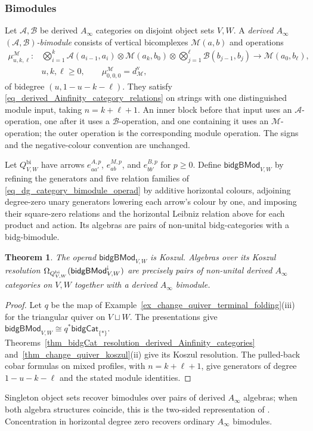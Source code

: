 \documentclass[11pt,letterpaper]{article}
\numberwithin{equation}{section}
\theoremstyle{plain}
\newtheorem{thm}{Theorem}[section]
\theoremstyle{definition}
\theoremstyle{remark}
\newcommand{\antishriek}{%
	\mathord{\mathchoice
		{\rotatebox[origin=c]{180}{$\displaystyle !$}}
		{\rotatebox[origin=c]{180}{$\textstyle !$}}
		{\rotatebox[origin=c]{180}{$\scriptstyle !$}}
		{\rotatebox[origin=c]{180}{$\scriptscriptstyle !$}}}}
\begin{document}
\subsubsection{Bimodules}
\label{sss_derived_Ainfinity_category_bimodules}
Let $\mathcal A,\mathcal B$ be derived $A_\infty$ categories on disjoint
object sets $V,W$. A \textit{derived $A_\infty$
$(\mathcal A,\mathcal B)$-bimodule} consists of vertical bicomplexes
$\mathcal M(a,b)$ and operations
\[
\begin{aligned}
 \mu^{\mathcal M}_{u,k,\ell}:{}
 &\bigotimes_{i=1}^{k}\mathcal A(a_{i-1},a_i)
 \otimes\mathcal M(a_k,b_0)
 \otimes\bigotimes_{j=1}^{\ell}\mathcal B(b_{j-1},b_j)
 \longrightarrow\mathcal M(a_0,b_\ell),\\
 &u,k,\ell\geq0,\qquad \mu^{\mathcal M}_{0,0,0}=d^{\mathrm v}_{\mathcal M},
\end{aligned}
\]
of bidegree $(u,1-u-k-\ell)$. They satisfy
\eqref{eq_derived_Ainfinity_category_relations} on strings
with one distinguished module input, taking $n=k+\ell+1$.
An inner block before that input uses an $\mathcal A$-operation, one
after it uses a $\mathcal B$-operation, and one containing it uses an
$\mathcal M$-operation; the outer operation is the corresponding module
operation. The signs and the negative-colour convention are unchanged.

Let $Q^{\mathrm{bi}}_{V,W}$ have arrows $e^{A,p}_{aa'}$, $e^{M,p}_{ab}$,
and $e^{B,p}_{bb'}$ for $p\geq0$. Define
$\mathsf{bidgBMod}_{V,W}$ by refining the generators and five relation
families of \eqref{eq_dg_category_bimodule_operad} by additive horizontal
colours, adjoining degree-zero unary generators lowering each arrow's
colour by one, and imposing their square-zero relations and the horizontal Leibniz
relation above for each product and action. Its algebras are pairs of
non-unital bidg-categories with a bidg-bimodule.

\begin{thm}\label{thm_derived_Ainfinity_category_bimodules}
The operad $\mathsf{bidgBMod}_{V,W}$ is Koszul. Algebras over its
Koszul resolution
$\Omega_{Q^{\mathrm{bi}}_{V,W}}
(\mathsf{bidgBMod}_{V,W}^{\antishriek})$
are precisely pairs of non-unital derived $A_\infty$ categories on
$V,W$ together with a derived $A_\infty$ bimodule.
\end{thm}
\begin{proof}
Let $q$ be the map of Example~\ref{ex_change_quiver_terminal_folding}(iii)
for the triangular quiver on $V\sqcup W$. The presentations give
$\mathsf{bidgBMod}_{V,W}\cong q^*\mathsf{bidgCat}_{\{*\}}$.
Theorems~\ref{thm_bidgCat_resolution_derived_Ainfinity_categories}
and~\ref{thm_change_quiver_koszul}(ii) give its Koszul resolution.
The pulled-back cobar formulas on mixed profiles, with $n=k+\ell+1$,
give generators of degree $1-u-k-\ell$ and the stated module identities.
\end{proof}
Singleton object sets recover bimodules over pairs of derived
$A_\infty$ algebras; when both algebra structures coincide, this is
the two-sided representation of
\cite[Theorem~4.20 and Remark~4.21]
{Aponte_Livernet_Robertson_Whitehouse_Ziegenhagen_representations}.
Concentration in horizontal degree zero recovers ordinary $A_\infty$
bimodules.
\end{document}
